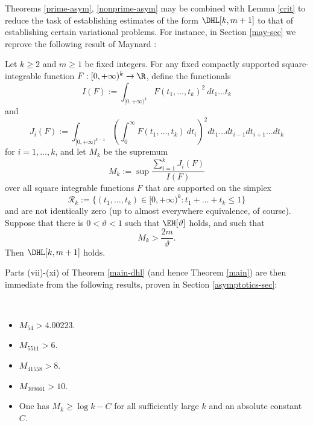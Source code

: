 Theorems \ref{prime-asym}, \ref{nonprime-asym} may be combined with Lemma \ref{crit} to reduce the task of establishing estimates of the form $\DHL[k,m+1]$ to that of establishing certain variational problems.  For instance, in Section \ref{may-sec} we reprove the following result of Maynard \cite[Proposition 4.2]{maynard-new}:

\begin{theorem}\label{maynard-thm}  Let $k \geq 2$ and $m \geq 1$ be fixed integers. For any fixed compactly supported square-integrable function $F: [0,+\infty)^k \to \R$, define the functionals
\begin{equation}\label{i-def}
I(F) := \int_{[0,+\infty)^k} F(t_1,\dots,t_k)^2\ dt_1 \dots t_k
\end{equation}
and
\begin{equation}\label{ji-def}
 J_i(F) := \int_{[0,+\infty)^{k-1}} \left(\int_0^\infty F(t_1,\dots,t_k)\ dt_i\right)^2 dt_1 \dots dt_{i-1} dt_{i+1} \dots dt_k
\end{equation}
for $i=1,\dots,k$, and let $M_k$ be the supremum
\begin{equation}\label{mk4}
 M_k := \sup \frac{\sum_{i=1}^k J_i(F)}{I(F)}
\end{equation}
over all square integrable functions $F$ that are supported on the simplex
$$ {\mathcal R}_k := \{ (t_1,\dots,t_k) \in [0,+\infty)^k: t_1+\dots+t_k \leq 1 \}$$
and are not identically zero (up to almost everywhere equivalence, of course).  Suppose that there is $0 < \vartheta < 1$ such that $\EH[\vartheta]$ holds, and such that
$$ M_k > \frac{2m}{\vartheta}.$$
Then $\DHL[k,m+1]$ holds.
\end{theorem}

Parts (vii)-(xi) of Theorem \ref{main-dhl} (and hence Theorem \ref{main}) are then immediate from the following results, proven in Section \ref{asymptotics-sec}:

\begin{theorem}\label{mlower}\ 
\begin{itemize}
\item[(vii)] $M_{54} > 4.00223$.
\item[(viii)] $M_{5511} > 6$.
\item[(ix)] $M_{41558} > 8$.
\item[(x)] $M_{309661} > 10$.
\item[(xi)] One has $M_k \geq \log k - C$ for all sufficiently large $k$ and an absolute constant $C$.
\end{itemize}
\end{theorem}

